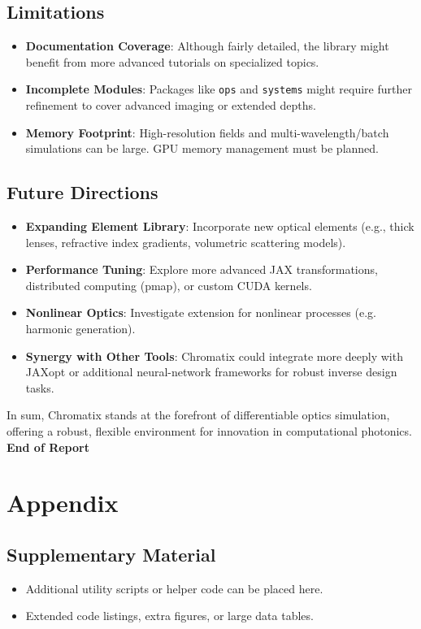 \documentclass[a4paper,12pt]{report}
\begin{document}
\section{Limitations}
\begin{itemize}
    \item \textbf{Documentation Coverage}: Although fairly detailed, the library might benefit from more advanced tutorials on specialized topics.
    \item \textbf{Incomplete Modules}: Packages like \texttt{ops} and \texttt{systems} might require further refinement to cover advanced imaging or extended depths.
    \item \textbf{Memory Footprint}: High-resolution fields and multi-wavelength/batch simulations can be large. GPU memory management must be planned.
\end{itemize}

\section{Future Directions}
\begin{itemize}
    \item \textbf{Expanding Element Library}: Incorporate new optical elements (e.g., thick lenses, refractive index gradients, volumetric scattering models).
    \item \textbf{Performance Tuning}: Explore more advanced JAX transformations, distributed computing (pmap), or custom CUDA kernels.
    \item \textbf{Nonlinear Optics}: Investigate extension for nonlinear processes (e.g. harmonic generation).
    \item \textbf{Synergy with Other Tools}: Chromatix could integrate more deeply with JAXopt or additional neural-network frameworks for robust inverse design tasks.
\end{itemize}

In sum, Chromatix stands at the forefront of differentiable optics simulation, offering a robust, flexible environment for innovation in computational photonics.\newline
\newline
\textbf{End of Report}

\clearpage



\appendix
\chapter{Appendix}
\section{Supplementary Material}
\begin{itemize}
    \item Additional utility scripts or helper code can be placed here.
    \item Extended code listings, extra figures, or large data tables.
\end{itemize}
\end{document}
